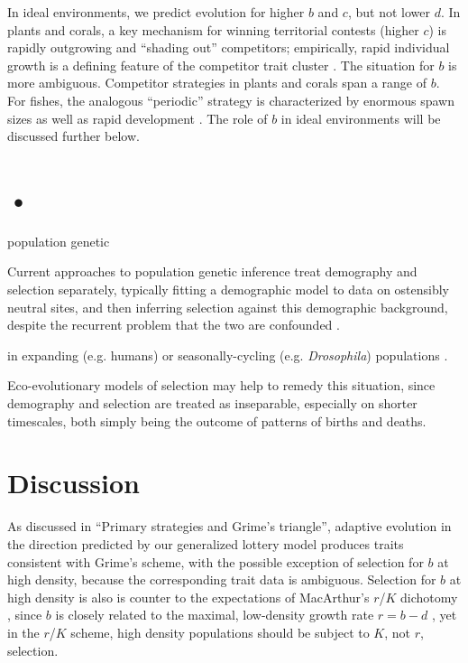 \documentclass[11pt]{article}
\begin{document}
In ideal environments, we predict evolution for higher $b$ and $c$, but not lower $d$. In plants and corals, a key mechanism for winning territorial contests (higher $c$) is rapidly outgrowing and ``shading out'' competitors; empirically, rapid individual growth is a defining feature of the competitor trait cluster \citep{grime_1977,darling_2012}. The situation for $b$ is more ambiguous. Competitor strategies in plants and corals span a range of $b$. For fishes, the analogous ``periodic'' strategy is characterized by enormous spawn sizes as well as rapid development \citep{winemiller_1992,winemiller_2015}. The role of $b$ in ideal environments will be discussed further below.

\section*{•}



 population genetic 

 
Current approaches to population genetic inference treat demography and selection separately, typically fitting a demographic model to data on ostensibly neutral sites, and then inferring selection against this demographic background, despite the recurrent problem that the two are confounded \citep{schrider_2016}.




in expanding (e.g. humans) or seasonally-cycling (e.g. \textit{Drosophila}) populations \citep{bergland_14}. 



 Eco-evolutionary models of selection may help to remedy this situation, since demography and selection are treated as inseparable, especially on shorter timescales, both simply being the outcome of patterns of births and deaths. 

\section*{Discussion}

As discussed in ``Primary strategies and Grime's triangle'', adaptive evolution in the direction predicted by our generalized lottery model produces traits consistent with Grime's scheme, with the possible exception of selection for $b$ at high density, because the corresponding trait data  is ambiguous. Selection for $b$ at high density is also is counter to the expectations of MacArthur's $r$/$K$ dichotomy \citep{macarthur_1967}, since $b$ is closely related to the maximal, low-density growth rate $r=b-d$ \citep{pianka_1972}, yet in the $r$/$K$ scheme, high density populations should be subject to $K$, not $r$, selection. 
\end{document}

